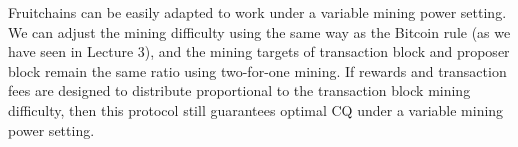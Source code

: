 \documentclass{article}
\begin{document}
Fruitchains can be easily adapted to work under a variable mining power setting. We can adjust the mining difficulty using the same way as the Bitcoin rule (as we have seen in Lecture 3), and the mining targets of transaction block and proposer block remain the same ratio using two-for-one mining. If rewards and transaction fees are designed to distribute proportional to the transaction block mining difficulty, then this protocol still guarantees optimal CQ under a variable mining power setting.

\fi



\end{document}
